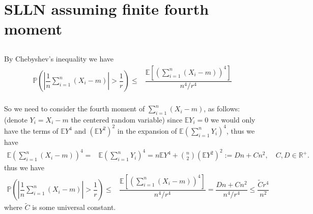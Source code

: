 \documentclass[11pt,a4paper]{article}
\numberwithin{equation}{section}%
\begin{document}
\section{SLLN assuming finite fourth moment}
\subsection{}

By Chebyshev's inequality we have
\begin{align*}
    \mathbb{P}\left( \left\vert \dfrac{ 1 }{ n } \sum_{i=1}^n (X_i-m) \right\vert > \dfrac{ 1 }{ r }   \right) \leq & \dfrac{ \mathbb{E}\left[ \left( \sum_{i=1}^n (X_i-m) \right)^4 \right] }{ n^4/r^4 }\\  
\end{align*}

So we need to consider the fourth moment of $ \sum_{i=1}^n (X_i-m) $, as follows: (denote $ Y_i=X_i-m $ the centered random variable) since $ \mathbb{E}Y_i=0 $ we would only have the terms of $ \mathbb{E}Y^4 $ and $ (\mathbb{E}Y^2)^2 $ in the expansion of $ \mathbb{E}(\sum_{i=1}^n Y_i)^4 $, thus we have
\begin{align*}
    \mathbb{E}(\sum_{i=1}^n (X_i-m))^4 =& \mathbb{E}(\sum_{i=1}^n Y_i)^4 = n\mathbb{E}Y^4 + \binom{n}{2}(\mathbb{E}Y^2)^2 := Dn + Cn^2,\quad C,D\in \mathbb{R}^+.
\end{align*}
thus we have 
\begin{align*}
    \mathbb{P}\left( \left\vert \dfrac{ 1 }{ n } \sum_{i=1}^n (X_i-m) \right\vert > \dfrac{ 1 }{ r }   \right) \leq &\dfrac{ \mathbb{E}\left[ \left( \sum_{i=1}^n (X_i-m) \right)^4 \right] }{ n^4/r^4 }= \dfrac{ Dn + Cn^2 }{ n^4/r^4 }\leq \dfrac{ \tilde{C}r^4 }{ n^2 } 
\end{align*}
where $ \tilde{C} $ is some universal constant.

\subsection{}
\end{document}
